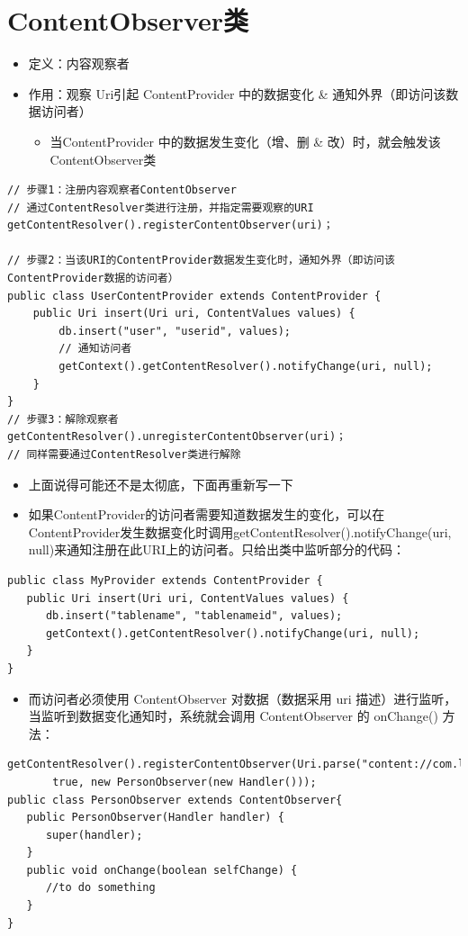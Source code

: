 \documentclass[9pt, b5paaper]{book}
\begin{document}
\section{ContentObserver类}
\label{sec-5-7}
\begin{itemize}
\item 定义：内容观察者
\item 作用：观察 Uri引起 ContentProvider 中的数据变化 \& 通知外界（即访问该数据访问者）
\begin{itemize}
\item 当ContentProvider 中的数据发生变化（增、删 \& 改）时，就会触发该 ContentObserver类
\end{itemize}
\end{itemize}
\begin{verbatim}
// 步骤1：注册内容观察者ContentObserver
// 通过ContentResolver类进行注册，并指定需要观察的URI
getContentResolver().registerContentObserver(uri)；

// 步骤2：当该URI的ContentProvider数据发生变化时，通知外界（即访问该ContentProvider数据的访问者）
public class UserContentProvider extends ContentProvider { 
    public Uri insert(Uri uri, ContentValues values) { 
        db.insert("user", "userid", values); 
        // 通知访问者
        getContext().getContentResolver().notifyChange(uri, null); 
    } 
}
// 步骤3：解除观察者
getContentResolver().unregisterContentObserver(uri)；
// 同样需要通过ContentResolver类进行解除
\end{verbatim}
\begin{itemize}
\item 上面说得可能还不是太彻底，下面再重新写一下
\item 如果ContentProvider的访问者需要知道数据发生的变化，可以在ContentProvider发生数据变化时调用getContentResolver().notifyChange(uri, null)来通知注册在此URI上的访问者。只给出类中监听部分的代码：
\end{itemize}
\begin{verbatim}
public class MyProvider extends ContentProvider {
   public Uri insert(Uri uri, ContentValues values) {
      db.insert("tablename", "tablenameid", values);
      getContext().getContentResolver().notifyChange(uri, null);
   }
}
\end{verbatim}
\begin{itemize}
\item 而访问者必须使用 ContentObserver 对数据（数据采用 uri 描述）进行监听，当监听到数据变化通知时，系统就会调用 ContentObserver 的 onChange() 方法：
\end{itemize}
\begin{verbatim}
getContentResolver().registerContentObserver(Uri.parse("content://com.ljq.providers.personprovider/person"),
       true, new PersonObserver(new Handler()));
public class PersonObserver extends ContentObserver{
   public PersonObserver(Handler handler) {
      super(handler);
   }
   public void onChange(boolean selfChange) {
      //to do something
   }
}
\end{verbatim}
\end{document}
